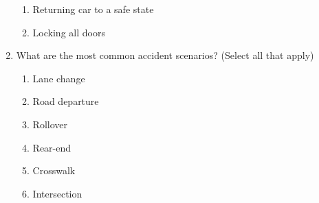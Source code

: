 \begin{enumerate}
\begin{enumerate}
		\item Returning car to a safe state
		\item Locking all doors
	\end{enumerate}
\item What are the most common accident scenarios? (Select all that apply)
	\begin{enumerate}
		\item Lane change
		\item Road departure
		\item Rollover
		\item Rear-end
		\item Crosswalk
		\item Intersection
	\end{enumerate}
\end{enumerate} 
 

